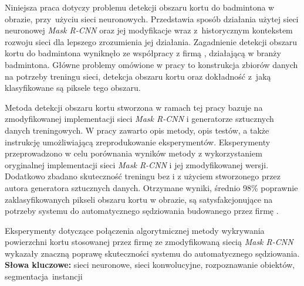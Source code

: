 Niniejsza praca dotyczy problemu detekcji obszaru kortu do badmintona w obrazie, przy~użyciu sieci neuronowych.
Przedstawia sposób działania użytej sieci neuronowej \textit{Mask R-CNN} oraz jej modyfikacje wraz z~historycznym kontekstem rozwoju sieci dla lepszego zrozumienia jej działania.
Zagadnienie detekcji obszaru kortu do badmintona wyniknęło ze współpracy z firmą \blue{}, działającą w branży badmintona.
Główne problemy omówione w pracy to konstrukcja zbiorów danych na potrzeby treningu sieci, detekcja obszaru kortu oraz dokładność z~jaką klasyfikowane są piksele tego obszaru.

Metoda detekcji obszaru kortu stworzona w ramach tej pracy bazuje na zmodyfikowanej implementacji sieci \textit{Mask R-CNN} i generatorze sztucznych danych treningowych.
W pracy zawarto opis metody, opis testów, a także instrukcję umożliwiającą zreprodukowanie eksperymentów. Eksperymenty przeprowadzono w celu porównania wyników metody z wykorzystaniem oryginalnej implementacji sieci \textit{Mask R-CNN} i jej zmodyfikowanej wersji.
Dodatkowo zbadano skuteczność treningu bez i z użyciem stworzonego przez autora generatora sztucznych danych. Otrzymane wyniki, średnio 98\% poprawnie zaklasyfikowanych pikseli obszaru kortu w obrazie, są satysfakcjonujące na potrzeby systemu do automatycznego sędziowania budowanego przez firmę \blue{}.

Eksperymenty dotyczące połączenia algorytmicznej metody wykrywania powierzchni kortu stosowanej przez firmę \blue{} ze zmodyfikowaną siecią \textit{Mask R-CNN} wykazały znaczną poprawę skuteczności systemu do automatycznego sędziowania.
\\

\noindent \textbf{Słowa kluczowe:} sieci neuronowe, sieci konwolucyjne, rozpoznawanie obiektów, segmentacja~instancji
